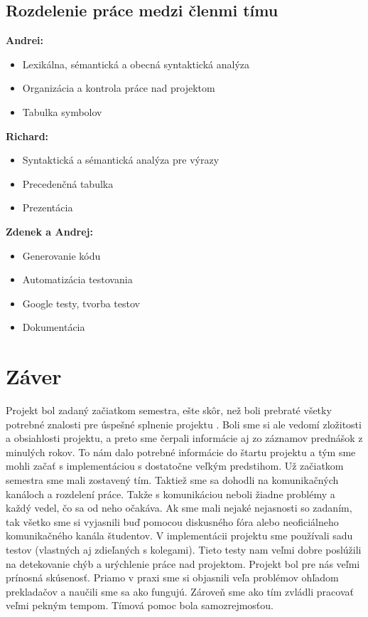 \documentclass[a4paper, 11pt]{article}
\begin{document}
    \subsection{Rozdelenie práce medzi členmi tímu}
    \leavevmode\newline
    \textbf{Andrei:}
    \begin{itemize}
        \item  Lexikálna, sémantická a obecná syntaktická analýza
        \item  Organizácia a kontrola práce nad projektom
        \item  Tabulka symbolov
    \end{itemize}\leavevmode\newline
    \textbf{Richard:}
    \begin{itemize}
        \item  Syntaktická a sémantická analýza pre výrazy
        \item  Precedenčná tabulka
        \item  Prezentácia
    \end{itemize}\leavevmode\newline
    \textbf{Zdenek a Andrej:}
    \begin{itemize}
        \item  Generovanie kódu
        \item  Automatizácia testovania
        \item  Google testy, tvorba testov
        \item  Dokumentácia
    \end{itemize}


    \section{Záver}
    Projekt bol zadaný začiatkom semestra, ešte skôr, než boli prebraté všetky potrebné znalosti pre
    úspešné splnenie projektu . Boli sme si ale vedomí zložitosti a obsiahlosti projektu,
    a preto sme čerpali informácie aj zo záznamov prednášok z minulých rokov. To nám dalo potrebné informácie do
    štartu projektu a tým sme mohli začať s implementáciou s dostatočne veľkým predstihom.
    Už začiatkom semestra sme mali zostavený tím. Taktiež sme sa dohodli na komunikačných kanáloch a rozdelení práce. Takže s
    komunikáciou neboli žiadne problémy a každý vedel, čo sa od neho očakáva.
    Ak sme mali nejaké nejasnosti so zadaním, tak všetko sme si vyjasnili buď pomocou diskusného fóra alebo
    neoficiálneho komunikačného kanála študentov. V implementácii projektu sme používali sadu testov
    (vlastných aj zdieľaných s kolegami).
    Tieto testy nam veľmi dobre poslúžili na detekovanie chýb a urýchlenie práce nad projektom.
    Projekt bol pre nás veľmi prínosná skúsenosť. Priamo v praxi sme si objasnili veľa problémov ohľadom prekladačov a naučili sme sa ako fungujú.
    Zároveň sme ako tím zvládli pracovať veľmi pekným tempom. Tímová pomoc bola samozrejmosťou.
\end{document}
